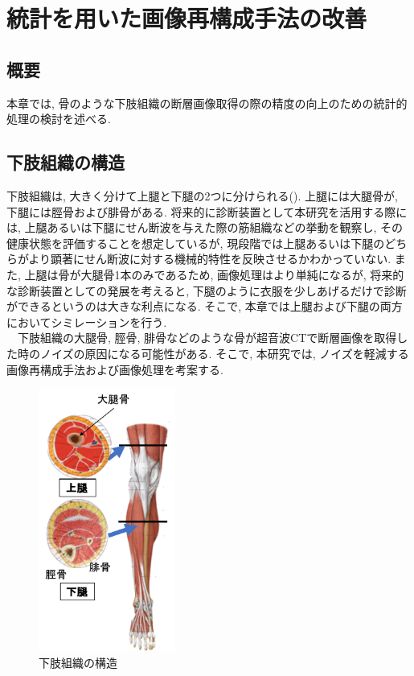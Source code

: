 \chapter{統計を用いた画像再構成手法の改善\label{saikousei}}
\newpage
\section{概要}
本章では, 骨のような下肢組織の断層画像取得の際の精度の向上のための統計的処理の検討を述べる.
\section{下肢組織の構造}
下肢組織は, 大きく分けて上腿と下腿の2つに分けられる(). 上腿には大腿骨が, 下腿には脛骨および腓骨がある. 将来的に診断装置として本研究を活用する際には, 上腿あるいは下腿にせん断波を与えた際の筋組織などの挙動を観察し, その健康状態を評価することを想定しているが, 現段階では上腿あるいは下腿のどちらがより顕著にせん断波に対する機械的特性を反映させるかわかっていない. また, 上腿は骨が大腿骨1本のみであるため, 画像処理はより単純になるが, 将来的な診断装置としての発展を考えると, 下腿のように衣服を少しあげるだけで診断ができるというのは大きな利点になる. そこで, 本章では上腿および下腿の両方においてシミレーションを行う. 
\\\ \ 下肢組織の大腿骨, 脛骨, 腓骨などのような骨が超音波CTで断層画像を取得した時のノイズの原因になる可能性がある. そこで, 本研究では, ノイズを軽減する画像再構成手法および画像処理を考案する. 
\begin{figure}[H]
  \begin{center}
    \includegraphics[width=45mm]{fig/kashisoshiki.pdf}
  \end{center}
  \caption{下肢組織の構造}
\end{figure}
